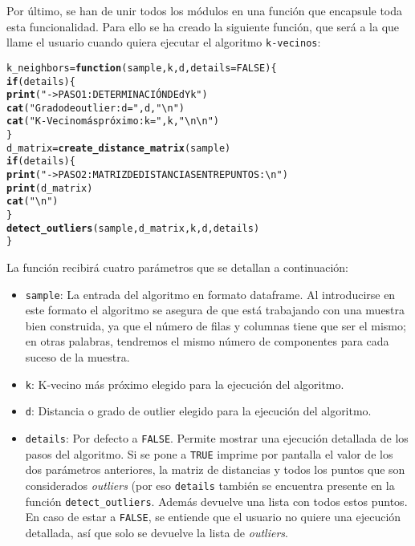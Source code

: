 \documentclass[12pt]{report}\usepackage[]{graphicx}\usepackage[dvipsnames]{xcolor}
\makeatletter
\newcommand{\hlnum}[1]{\textcolor[rgb]{0.686,0.059,0.569}{#1}}%
\newcommand{\hlstr}[1]{\textcolor[rgb]{0.192,0.494,0.8}{#1}}%
\newcommand{\hlstd}[1]{\textcolor[rgb]{0.345,0.345,0.345}{#1}}%
\newcommand{\hlkwa}[1]{\textcolor[rgb]{0.161,0.373,0.58}{\textbf{#1}}}%
\newcommand{\hlkwb}[1]{\textcolor[rgb]{0.69,0.353,0.396}{#1}}%
\newcommand{\hlkwc}[1]{\textcolor[rgb]{0.333,0.667,0.333}{#1}}%
\newcommand{\hlkwd}[1]{\textcolor[rgb]{0.737,0.353,0.396}{\textbf{#1}}}%
\newenvironment{kframe}{%
 \def\at@end@of@kframe{}%
 \ifinner\ifhmode%
  \def\at@end@of@kframe{\end{minipage}}%
  \begin{minipage}{\columnwidth}%
 \fi\fi%
 \def\FrameCommand##1{\hskip\@totalleftmargin \hskip-\fboxsep
 \colorbox{shadecolor}{##1}\hskip-\fboxsep
     \hskip-\linewidth \hskip-\@totalleftmargin \hskip\columnwidth}%
 \MakeFramed {\advance\hsize-\width
   \@totalleftmargin\z@ \linewidth\hsize
   \@setminipage}}%
 {\par\unskip\endMakeFramed%
 \at@end@of@kframe}
\newenvironment{knitrout}{}{} %
\makeatother
\begin{document}
					Por último, se han de unir todos los módulos en una función que encapsule toda esta funcionalidad. Para ello se ha creado la siguiente función, que será a la que llame el usuario cuando quiera ejecutar el algoritmo \texttt{k-vecinos}:
					
\begin{knitrout}
\color{fgcolor}\begin{kframe}
\begin{alltt}
\hlstd{k_neighbors} \hlkwb{=} \hlkwa{function}\hlstd{(}\hlkwc{sample}\hlstd{,} \hlkwc{k}\hlstd{,} \hlkwc{d}\hlstd{,} \hlkwc{details} \hlstd{=} \hlnum{FALSE}\hlstd{)\{}
        \hlkwa{if}\hlstd{(details)\{}
                \hlkwd{print}\hlstd{(}\hlstr{"->PASO 1: DETERMINACIÓN DE d Y k"}\hlstd{)}
                \hlkwd{cat}\hlstd{(}\hlstr{"Grado de outlier: d ="}\hlstd{,d,}\hlstr{"\textbackslash{}n"}\hlstd{)}
                \hlkwd{cat}\hlstd{(}\hlstr{"K-Vecino más próximo: k ="}\hlstd{,k,}\hlstr{"\textbackslash{}n\textbackslash{}n"}\hlstd{)}
        \hlstd{\}}
        \hlstd{d_matrix} \hlkwb{=} \hlkwd{create_distance_matrix}\hlstd{(sample)}
        \hlkwa{if}\hlstd{(details)\{}
                \hlkwd{print}\hlstd{(}\hlstr{"->PASO 2: MATRIZ DE DISTANCIAS ENTRE PUNTOS:\textbackslash{}n"}\hlstd{)}
                \hlkwd{print}\hlstd{(d_matrix)}
                \hlkwd{cat}\hlstd{(}\hlstr{"\textbackslash{}n"}\hlstd{)}
        \hlstd{\}}
        \hlkwd{detect_outliers}\hlstd{(sample, d_matrix, k, d, details)}
\hlstd{\}}
\end{alltt}
\end{kframe}
\end{knitrout}
					
					La función recibirá cuatro parámetros que se detallan a continuación:
					
					\begin{itemize}
						\item \texttt{sample}: La entrada del algoritmo en formato dataframe. Al introducirse en este formato el algoritmo se asegura de que está trabajando con una muestra bien construida, ya que el número de filas y columnas tiene que ser el mismo; en otras palabras, tendremos el mismo número de componentes para cada suceso de la muestra.
						\item \texttt{k}: K-vecino más próximo elegido para la ejecución del algoritmo.
						\item \texttt{d}: Distancia o grado de outlier elegido para la ejecución del algoritmo.
						\item \texttt{details}: Por defecto a \texttt{FALSE}. Permite mostrar una ejecución detallada de los pasos del algoritmo. Si se pone a \texttt{TRUE} imprime por pantalla el valor de los dos parámetros anteriores, la matriz de distancias y todos los puntos que son considerados \textit{outliers} (por eso \texttt{details} también se encuentra presente en la función \texttt{detect\_outliers}. Además devuelve una lista con todos estos puntos. En caso de estar a \texttt{FALSE}, se entiende que el usuario no quiere una ejecución detallada, así que solo se devuelve la lista de \textit{outliers}.
					\end{itemize}
					
\end{document}
